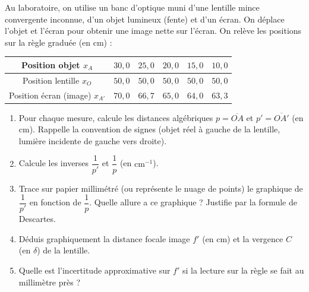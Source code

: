 \documentclass[11pt]{article}
\begin{document}
\begin{exercice}
Au laboratoire, on utilise un banc d'optique muni d'une lentille mince convergente inconnue, d'un objet lumineux (fente) et d'un écran. On déplace l'objet et l'écran pour obtenir une image nette sur l'écran. On relève les positions sur la règle graduée (en cm) :
\begin{center}
\begin{tabular}{|c|c|c|c|c|c|}\hline
Position objet $x_A$ & $30,0$ & $25,0$ & $20,0$ & $15,0$ & $10,0$ \\ \hline
Position lentille $x_O$ & $50,0$ & $50,0$ & $50,0$ & $50,0$ & $50,0$ \\ \hline
Position écran (image) $x_{A'}$ & $70,0$ & $66,7$ & $65,0$ & $64,0$ & $63,3$ \\ \hline
\end{tabular}
\end{center}
\begin{enumerate}
    \item Pour chaque mesure, calcule les distances algébriques $p = \overline{OA}$ et $p' = \overline{OA'}$ (en cm). Rappelle la convention de signes (objet réel à gauche de la lentille, lumière incidente de gauche vers droite).
    \item Calcule les inverses $\dfrac{1}{p'}$ et $\dfrac{1}{p}$ (en $\text{cm}^{-1}$).
    \item Trace sur papier millimétré (ou représente le nuage de points) le graphique de $\dfrac{1}{p'}$ en fonction de $\dfrac{1}{p}$. Quelle allure a ce graphique ? Justifie par la formule de Descartes.
    \item Déduis graphiquement la distance focale image $f'$ (en cm) et la vergence $C$ (en $\delta$) de la lentille.
    \item Quelle est l'incertitude approximative sur $f'$ si la lecture sur la règle se fait au millimètre près ?
\end{enumerate}
\end{exercice}
\end{document}
